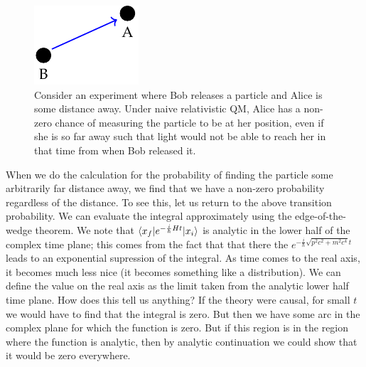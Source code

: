 \begin{figure}[htbp]
    \centering
    \includegraphics[]{Images/fig-RQMABcartoon.pdf}

    \caption{Consider an experiment where Bob releases a particle and Alice is some distance away. Under naive relativistic QM, Alice has a non-zero chance of measuring the particle to be at her position, even if she is so far away such that light would not be able to reach her in that time from when Bob released it.}
    \label{fig-RQMABcartoon}
\end{figure}
When we do the calculation for the probability of finding the particle some arbitrarily far distance away, we find that we have a non-zero probability regardless of the distance. To see this, let us return to the above transition probability. We can evaluate the integral approximately using the edge-of-the-wedge theorem. We note that $\langle x_f \rvert e^{-\frac{i}{\hbar}Ht}\lvert x_i \rangle$ is analytic in the lower half of the complex time plane; this comes from the fact that that there the $ e^{-\frac{i}{\hbar}\sqrt{p^2c^2 + m^2c^4}t}$ leads to an exponential supression of the integral. As time comes to the real axis, it becomes much less nice (it becomes something like a distribution). We can define the value on the real axis as the limit taken from the analytic lower half time plane. How does this tell us anything? If the theory were causal, for small $t$ we would have to find that the integral is zero. But then we have some arc in the complex plane for which the function is zero. But if this region is in the region where the function is analytic, then by analytic continuation we could show that it would be zero everywhere. 

